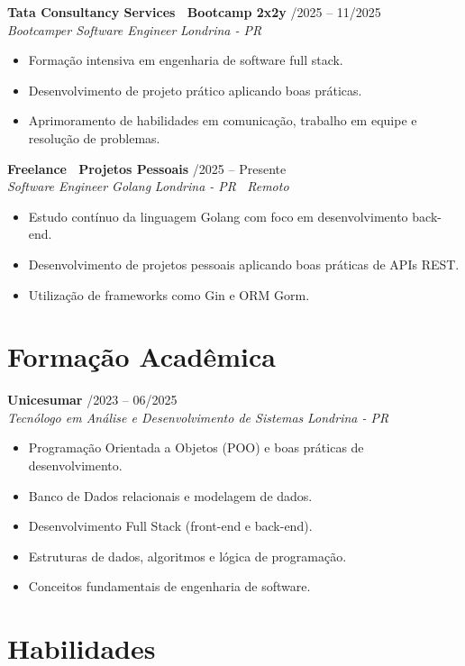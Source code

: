 \documentclass[a4paper,10pt]{article}
\newcommand{\entry}[4]{
  \noindent\textbf{#1} \hfill #2 \\
  \noindent\textit{#3} \hfill \textit{#4} \\
  \vspace{2pt}
}
\begin{document}
\entry{Tata Consultancy Services \textbar\ Bootcamp 2x2y}{\faCalendar \space 05/2025 -- 11/2025}{Bootcamper Software Engineer}{Londrina - PR}
\vspace{-0.4em}
\begin{itemize}[leftmargin=*, itemsep=2pt]
\setlength\itemsep{0em}
\item Formação intensiva em engenharia de software full stack.
\item Desenvolvimento de projeto prático aplicando boas práticas.
\item Aprimoramento de habilidades em comunicação, trabalho em equipe e resolução de problemas.
\end{itemize}

\entry{Freelance \textbar\ Projetos Pessoais}{\faCalendar \space 05/2025 -- Presente}{Software Engineer Golang}{Londrina - PR \textbar\ Remoto}
\vspace{-0.4em}
\begin{itemize}[leftmargin=*, itemsep=2pt]
\setlength\itemsep{0em}
\item Estudo contínuo da linguagem Golang com foco em desenvolvimento back-end.
\item Desenvolvimento de projetos pessoais aplicando boas práticas de APIs REST.
\item Utilização de frameworks como Gin e ORM Gorm.
\end{itemize}

\section*{Formação Acadêmica}

\entry{Unicesumar}{\faCalendar {}/2023 -- 06/2025}{Tecnólogo em Análise e Desenvolvimento de Sistemas}{Londrina - PR}
\vspace{-0.4em}
\begin{itemize}[leftmargin=*, itemsep=2pt]
\item Programação Orientada a Objetos (POO) e boas práticas de desenvolvimento.
\item Banco de Dados relacionais e modelagem de dados.
\item Desenvolvimento Full Stack (front-end e back-end).
\item Estruturas de dados, algoritmos e lógica de programação.
\item Conceitos fundamentais de engenharia de software.
\end{itemize}

\section*{Habilidades}
\end{document}
